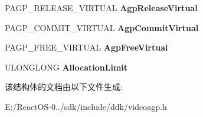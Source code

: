 \begin{DoxyCompactItemize}
\mbox{\label{struct___v_i_d_e_o___p_o_r_t___a_g_p___s_e_r_v_i_c_e_s_ab8cae5386aef217cdec2fab9eae2e6bd}} 
P\+A\+G\+P\+\_\+\+R\+E\+L\+E\+A\+S\+E\+\_\+\+V\+I\+R\+T\+U\+AL {\bfseries Agp\+Release\+Virtual}
\item 
\mbox{\label{struct___v_i_d_e_o___p_o_r_t___a_g_p___s_e_r_v_i_c_e_s_a742093bd5fa9a460d54e96ebfc45fc8c}} 
P\+A\+G\+P\+\_\+\+C\+O\+M\+M\+I\+T\+\_\+\+V\+I\+R\+T\+U\+AL {\bfseries Agp\+Commit\+Virtual}
\item 
\mbox{\label{struct___v_i_d_e_o___p_o_r_t___a_g_p___s_e_r_v_i_c_e_s_ac30ed07480b160e0d6c0f1bf25d7b6ae}} 
P\+A\+G\+P\+\_\+\+F\+R\+E\+E\+\_\+\+V\+I\+R\+T\+U\+AL {\bfseries Agp\+Free\+Virtual}
\item 
\mbox{\label{struct___v_i_d_e_o___p_o_r_t___a_g_p___s_e_r_v_i_c_e_s_a90ea71de3745bc264042d23e90cf9b9e}} 
U\+L\+O\+N\+G\+L\+O\+NG {\bfseries Allocation\+Limit}
\end{DoxyCompactItemize}


该结构体的文档由以下文件生成\+:\begin{DoxyCompactItemize}
\item 
E\+:/\+React\+O\+S-\/0../sdk/include/ddk/videoagp.\+h\end{DoxyCompactItemize}
